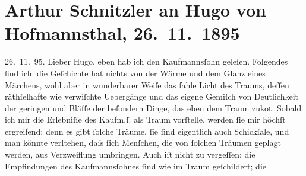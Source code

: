

         
         \newcommand{\erwaehntePersonen}{Personen: Hugo von Hofmannsthal}
         \newcommand{\erwaehnteOrte}{Orte: Wien}
         \newcommand{\erwaehnteWerke}{Werke: Das Märchen der 672. Nacht}
               \section[Arthur Schnitzler an Hugo von Hofmannsthal, 26. 11. 1895]{ Arthur Schnitzler an Hugo von Hofmannsthal, 26. 11. 1895}\nopagebreak{}\rehead{ }\begin{ledgroupsized}[t]{13cm}\normalsize\beginnumbering \toendnotes[C]{\smallbreak\pagebreak[2]} 
\toendnotes[C]{\smallbreak}\pstart
           \raggedleft{}{\pb}26. 11. 95.\pend
           \pstart
           Lieber Hugo, eben hab ich den Kaufmannsſohn geleſen. Folgendes find ich: die Geſchichte hat nichts von der
               Wärme und dem Glanz eines Märchens, wohl aber in wunderbarer Weiſe das fahle Licht
               des Traums, deſſen räthſelhafte wie verwiſchte Uebergänge und das eigene Gemiſch von
               Deutlichkeit der geringen und Bläſſe der beſondern Dinge, das eben dem Traum zuko{\geminationm}t. Sobald ich mir die Erlebniſſe des Kaufm.ſ. als Traum vorſtelle, werden ſie mir
               höchſt ergreifend; denn es gibt ſolche Träume, ſie ſind eigentlich auch Schickſale,
               und man könnte verſtehen, daſs ſich Menſchen, die von ſolchen Träumen geplagt {\pb}werden, aus Verzweiflung umbringen. Auch iſt nicht zu
               vergeſſen: die Empfindungen des Kaufmannsſohnes ſind wie im Traum geſchildert; die

\end{ledgroupsized}
